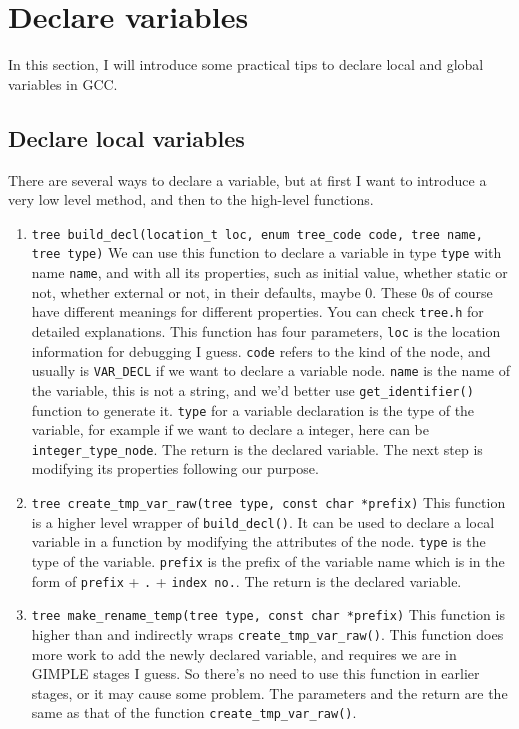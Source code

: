 \documentclass[11pt]{article}
\begin{document}
\pagebreak

\section{Declare variables}
In this section, I will introduce some practical tips to declare local and global variables in GCC. 

\subsection{Declare local variables}
\label{sec:subsec:declareLocalVar}
There are several ways to declare a variable, but at first I want to introduce a very low level method, and then to the high-level functions.

\begin{enumerate}
\item \texttt{tree build\_decl(location\_t loc, enum tree\_code code, tree name, tree type)}
We can use this function to declare a variable in type \texttt{type} with name \texttt{name}, and with all its properties, such as initial value, whether static or not, whether external or not, in their defaults, maybe 0. These 0s of course have different meanings for different properties. You can check \texttt{tree.h} for detailed explanations. This function has four parameters, \texttt{loc} is the location information for debugging I guess. \texttt{code} refers to the kind of the node, and usually is \texttt{VAR\_DECL} if we want to declare a variable node. \texttt{name} is the name of the variable, this is not a string, and we'd better use \texttt{get\_identifier()} function to generate it. \texttt{type} for a variable declaration is the type of the variable, for example if we want to declare a integer, here can be \texttt{integer\_type\_node}. The return is the declared variable. The next step is modifying its properties following our purpose.\\

\item \texttt{tree create\_tmp\_var\_raw(tree type, const char *prefix)}
This function is a higher level wrapper of \texttt{build\_decl()}. It can be used to declare a local variable in a function by modifying the attributes of the node. \texttt{type} is the type of the variable. \texttt{prefix} is the prefix of the variable name which is in the form of \texttt{prefix} + \texttt{.} + \texttt{index no.}. The return is the declared variable.\\ 

\item \texttt{tree make\_rename\_temp(tree type, const char *prefix)}
This function is higher than and indirectly wraps \texttt{create\_tmp\_var\_raw()}. This function does more work to add the newly declared variable, and requires we are in GIMPLE stages I guess. So there's no need to use this function in earlier stages, or it may cause some problem. The parameters and the return are the same as that of the function \texttt{create\_tmp\_var\_raw()}.\\

\end{enumerate}
\end{document}
